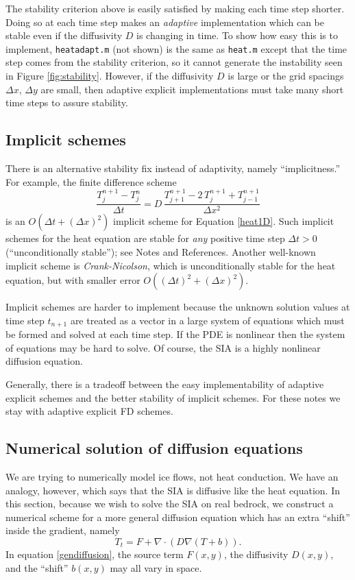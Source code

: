 \documentclass[letterpaper,final,12pt,reqno]{amsart}
\newcommand{\grad}{\nabla}
\newcommand{\Div}{\nabla\cdot}
\begin{document}
The stability criterion above is easily satisfied by making each time step shorter.  Doing so at each time step makes an \emph{adaptive} implementation which can be stable even if the diffusivity $D$ is changing in time.  To show how easy this is to implement, \texttt{heatadapt.m} (not shown) is the same as \texttt{heat.m} except that the time step comes from the stability criterion, so it cannot generate the instability seen in Figure \ref{fig:stability}.  However, if the diffusivity $D$ is large or the grid spacings $\Delta x$, $\Delta y$ are small, then adaptive explicit implementations must take many short time steps to assure stability.


\subsection*{Implicit schemes}  There is an alternative stability fix instead of adaptivity, namely ``implicitness.''  For example, the finite difference scheme
\begin{equation}
  \frac{T_j^{n+1} - T_j^n}{\Delta t} = D\,\frac{T_{j+1}^{n+1} - 2\, T_j^{n+1} + T_{j-1}^{n+1}}{\Delta x^2} \label{implicit1D}
\end{equation}
is an $O(\Delta t + (\Delta x)^2)$ implicit scheme for Equation \eqref{heat1D}.  Such implicit schemes for the heat equation are stable for \emph{any} positive time step $\Delta t>0$ (``unconditionally stable''); see Notes and References.  Another well-known implicit scheme is \emph{Crank-Nicolson}, which is unconditionally stable for the heat equation, but with smaller error $O((\Delta t)^2 +(\Delta x)^2)$.

Implicit schemes are harder to implement because the unknown solution values at time step $t_{n+1}$ are treated as a vector in a large system of equations which must be formed and solved at each time step.  If the PDE is nonlinear then the system of equations may be hard to solve.  Of course, the SIA is a highly nonlinear diffusion equation.

Generally, there is a tradeoff between the easy implementability of adaptive explicit schemes and the better stability of implicit schemes.  For these notes we stay with adaptive explicit FD schemes.

\subsection*{Numerical solution of diffusion equations}  We are trying to numerically model ice flows, not heat conduction.  We have an analogy, however, which says that the SIA is diffusive like the heat equation.  In this section, because we wish to solve the SIA on real bedrock, we construct a numerical scheme for a more general diffusion equation which has an extra ``shift'' inside the gradient, namely
\begin{equation}
  T_t = F + \Div \left(D \grad (T + b)\right). \label{gendiffusion}
\end{equation}
In equation \eqref{gendiffusion}, the source term $F(x,y)$, the diffusivity $D(x,y)$, and the ``shift'' $b(x,y)$ may all vary in space.
\end{document}

